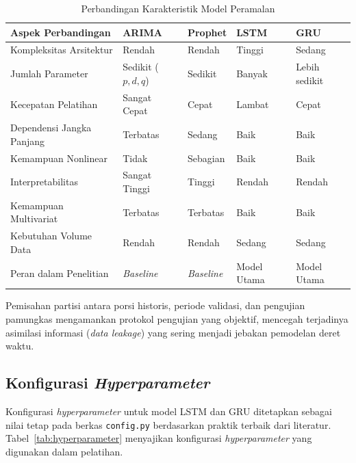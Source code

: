 \begin{table}[htbp]
\centering
\caption{Perbandingan Karakteristik Model Peramalan}
\label{tab:perbandingan-model}
\begin{tabular}{|p{3.5cm}|p{2.5cm}|p{2.5cm}|p{2.5cm}|p{2.5cm}|}
\hline
\textbf{Aspek Perbandingan} & \textbf{ARIMA} & \textbf{Prophet} & \textbf{LSTM} & \textbf{GRU} \\
\hline
Kompleksitas Arsitektur & Rendah & Rendah & Tinggi & Sedang \\
\hline
Jumlah Parameter & Sedikit (\(p,d,q\)) & Sedikit & Banyak & Lebih sedikit \\
\hline
Kecepatan Pelatihan & Sangat Cepat & Cepat & Lambat & Cepat \\
\hline
Dependensi Jangka Panjang & Terbatas & Sedang & Baik & Baik \\
\hline
Kemampuan Nonlinear & Tidak & Sebagian & Baik & Baik \\
\hline
Interpretabilitas & Sangat Tinggi & Tinggi & Rendah & Rendah \\
\hline
Kemampuan Multivariat & Terbatas & Terbatas & Baik & Baik \\
\hline
Kebutuhan Volume Data & Rendah & Rendah & Sedang & Sedang \\
\hline
Peran dalam Penelitian & \textit{Baseline} & \textit{Baseline} & Model Utama & Model Utama \\
\hline
\end{tabular}
\end{table}

Pemisahan partisi antara porsi historis, periode validasi, dan pengujian pamungkas mengamankan protokol pengujian yang objektif, mencegah terjadinya asimilasi informasi (\textit{data leakage}) yang sering menjadi jebakan pemodelan deret waktu.

\subsection{Konfigurasi \textit{Hyperparameter}}
\label{subsec:hyperparameter}

Konfigurasi \textit{hyperparameter} untuk model LSTM dan GRU ditetapkan sebagai nilai tetap pada berkas \texttt{config.py} berdasarkan praktik terbaik dari literatur. Tabel~\ref{tab:hyperparameter} menyajikan konfigurasi \textit{hyperparameter} yang digunakan dalam pelatihan.

